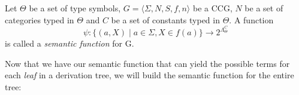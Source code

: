 \documentclass[main.tex]{subfiles}
\begin{document}
\begin{defn}
    Let $\Theta$ be a set of type symbols,
    $ G = \langle \Sigma, N, S, f, n \rangle $ be a CCG, $N$ be
    a set of categories typed in $\Theta$ and $C$ be a set
    of constants typed in $\Theta$.
    A function
    \[ \psi : \{ (a, X) \mid a \in \Sigma, X \in f(a) \} \rightarrow 2^{\Lambda_{\Theta}^C} \] is called a
    \emph{semantic function} for G.
\end{defn}


Now that we have our semantic function that can yield the possible terms
for each \emph{leaf} in a derivation tree, we will build the semantic function
for the entire tree:
\end{document}
